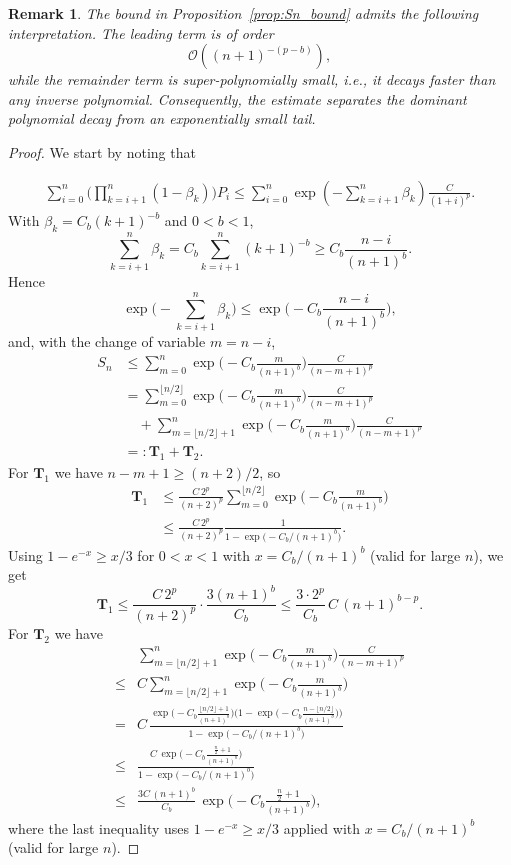 \documentclass{article}
\newtheorem{remark}[theorem]{Remark}
\begin{document}
\begin{remark}
The bound in Proposition~\ref{prop:Sn_bound} admits the following interpretation.
The leading term is of order
\[
    \mathcal{O}\!\left((n+1)^{-(p-b)}\right),
\]
while the remainder term is super-polynomially small, i.e., it decays faster
than any inverse polynomial. Consequently, the estimate separates the dominant
polynomial decay from an exponentially small tail.
\end{remark}

\begin{proof}
We start by noting that
 
 \[
\begin{aligned}
\sum_{i=0}^{n}
\Bigg(
\prod_{k=i+1}^{n} (1-\beta_k)
\Bigg) P_i
\le
\sum_{i=0}^{n}
\exp\!\left(
- \sum_{k=i+1}^{n} \beta_k
\right)
\frac{C}{(1+i)^p}.
\end{aligned}
\]
With \(\beta_k=C_b(k+1)^{-b}\) and \(0<b<1\),
\[
\sum_{k=i+1}^n \beta_k
= C_b\sum_{k=i+1}^n (k+1)^{-b}
\ge C_b\frac{n-i}{(n+1)^b}.
\]
Hence
\[
\exp\!\Big(-\sum_{k=i+1}^n\beta_k\Big)
\le
\exp\!\Big(-C_b\frac{n-i}{(n+1)^b}\Big),
\]
and, with the change of variable \(m=n-i\),
\[
\begin{aligned}
S_n
&\le
\sum_{m=0}^n
\exp\!\Big(-C_b\frac{m}{(n+1)^b}\Big)
\frac{C}{(n-m+1)^p}
\\
&=
\sum_{m=0}^{\lfloor n/2\rfloor}
\exp\!\Big(-C_b\frac{m}{(n+1)^b}\Big)
\frac{C}{(n-m+1)^p}
\\
&\quad+
\sum_{m=\lfloor n/2\rfloor+1}^{n}
\exp\!\Big(-C_b\frac{m}{(n+1)^b}\Big)
\frac{C}{(n-m+1)^p}
\\
&=: \mathbf T_1 + \mathbf T_2.
\end{aligned}
\]
For \(\mathbf T_1\) we have \(n-m+1\ge (n+2)/2\), so
\[
\begin{aligned}
\mathbf T_1
&\le
\frac{C\,2^p}{(n+2)^p}
\sum_{m=0}^{\lfloor n/2\rfloor}
\exp\!\Big(-C_b\frac{m}{(n+1)^b}\Big)
\\
&\le
\frac{C\,2^p}{(n+2)^p}
\frac{1}{1-\exp\!\big(-C_b/(n+1)^b\big)}. 
\end{aligned}
\]
Using \(1-e^{-x}\ge x/3\) for \(0<x<1\) with \(x=C_b/(n+1)^b\) (valid for large \(n\)), we get
\[
\mathbf T_1
\le
\frac{C\,2^p}{(n+2)^p}\cdot\frac{3(n+1)^b}{C_b}
\le
\frac{3\cdot 2^p}{C_b}\,C\,(n+1)^{b-p}.
\]
For \(\mathbf{T}_2\) we have
\[
\begin{aligned}
&\sum_{m=\lfloor n/2 \rfloor + 1}^{n}
\exp\!\Big(-C_b\frac{m}{(n+1)^b}\Big)
\frac{C}{(n-m+1)^p}
\\
\le{}&
C \sum_{m=\lfloor n/2 \rfloor + 1}^{n}
\exp\!\Big(-C_b\frac{m}{(n+1)^b}\Big)
\\
={}&
C\,
\frac{
    \exp\!\Big(-C_b\frac{\lfloor n/2 \rfloor + 1}{(n+1)^b}\Big)
    \Big(1-\exp\!\big(-C_b\frac{n-\lfloor n/2 \rfloor}{(n+1)^b}\big)\Big)
}{
    1-\exp\!\big(-C_b/(n+1)^b\big)
}
\\
\le{}&
\frac{C\,\exp\!\big(-C_b\frac{\tfrac{n}{2}+1}{(n+1)^b}\big)}
{1-\exp\!\big(-C_b/(n+1)^b\big)}
\\
\le{}&
\frac{3C\,(n+1)^b}{C_b}\,
\exp\!\Big(-C_b\frac{\tfrac{n}{2}+1}{(n+1)^b}\Big),
\end{aligned}
\]
where the last inequality uses \(1-e^{-x}\ge x/3\) applied with
\(x=C_b/(n+1)^b\) (valid for large \(n\)).


\end{proof}
\end{document}
